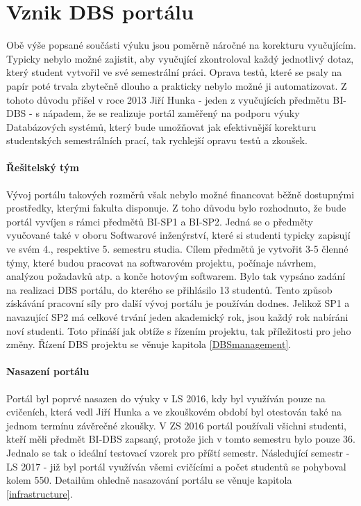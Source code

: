 \section{Vznik DBS portálu} \label{DBSportal:creation}
Obě výše popsané součásti výuku jsou poměrně náročné na korekturu vyučujícím. Typicky nebylo možné zajistit, aby vyučující zkontroloval každý jednotlivý dotaz, který student vytvořil ve své semestrální práci. Oprava testů, které se psaly na papír poté trvala zbytečně dlouho a prakticky nebylo možné ji automatizovat. Z tohoto důvodu přišel v roce 2013 Jiří Hunka - jeden z vyučujících předmětu BI-DBS - s nápadem, že se realizuje portál zaměřený na podporu výuky Databázových systémů, který bude umožňovat jak efektivnější korekturu studentských semestrálních prací, tak rychlejší opravu testů a zkoušek.

\paragraph{Řešitelský tým}
Vývoj portálu takových rozměrů však nebylo možné financovat běžně dostupnými prostředky, kterými fakulta disponuje. Z toho důvodu bylo rozhodnuto, že bude portál vyvíjen s rámci předmětů BI-SP1 a BI-SP2. Jedná se o předměty vyučované také v oboru Softwarové inženýrství, které si studenti typicky zapisují ve svém 4., respektive 5. semestru studia. Cílem předmětů je vytvořit 3-5 členné týmy, které budou pracovat na softwarovém projektu, počínaje návrhem, analýzou požadavků atp. a konče hotovým softwarem. Bylo tak vypsáno zadání na realizaci DBS portálu, do kterého se přihlásilo 13 studentů.
Tento způsob získávání pracovní síly pro další vývoj portálu je používán dodnes. Jelikož SP1 a navazující SP2 má celkové trvání jeden akademický rok, jsou každý rok nabíráni noví studenti. Toto přináší jak obtíže s řízením projektu, tak příležitosti pro jeho změny. Řízení DBS projektu se věnuje kapitola \ref{DBSmanagement}.

\paragraph{Nasazení portálu}
Portál byl poprvé nasazen do výuky v LS 2016, kdy byl využíván pouze na cvičeních, která vedl Jiří Hunka a ve zkouškovém období byl otestován také na jednom termínu závěrečné zkoušky.
V ZS 2016 portál používali všichni studenti, kteří měli předmět BI-DBS zapsaný, protože jich v tomto semestru bylo pouze 36. Jednalo se tak o ideální testovací vzorek pro příští semestr. Následující semestr - LS 2017 - již byl portál využíván všemi cvičícími a počet studentů se pohyboval kolem 550. Detailům ohledně nasazování portálu se věnuje kapitola \ref{infrastructure}.

